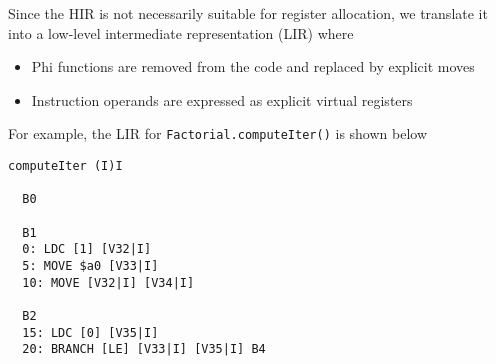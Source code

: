 \documentclass[8pt,a4paper,compress]{beamer}
\begin{document}
\begin{frame}[fragile]
\pause

Since the HIR is not necessarily suitable for register allocation, we translate it into a low-level intermediate representation (LIR) where

\begin{itemize}
\item Phi functions are removed from the code and replaced by explicit moves

\item Instruction operands are expressed as explicit virtual registers
\end{itemize}

\pause
\bigskip

For example, the LIR for \lstinline{Factorial.computeIter()} is shown below

\begin{lstlisting}[language={}]
computeIter (I)I

  B0

  B1
  0: LDC [1] [V32|I]
  5: MOVE $a0 [V33|I]                                                                                                                                                                                                                         
  10: MOVE [V32|I] [V34|I]                                                                                                                                                                                                                    
                                                                                                                                                                                                                                              
  B2                                                                                                                                                                                                                                          
  15: LDC [0] [V35|I]                                                                                                                                                                                                                         
  20: BRANCH [LE] [V33|I] [V35|I] B4                                                                                                                                                                                                          
                                                                                                                                                                                                                                              

\end{lstlisting}
\end{frame}
\end{document}
